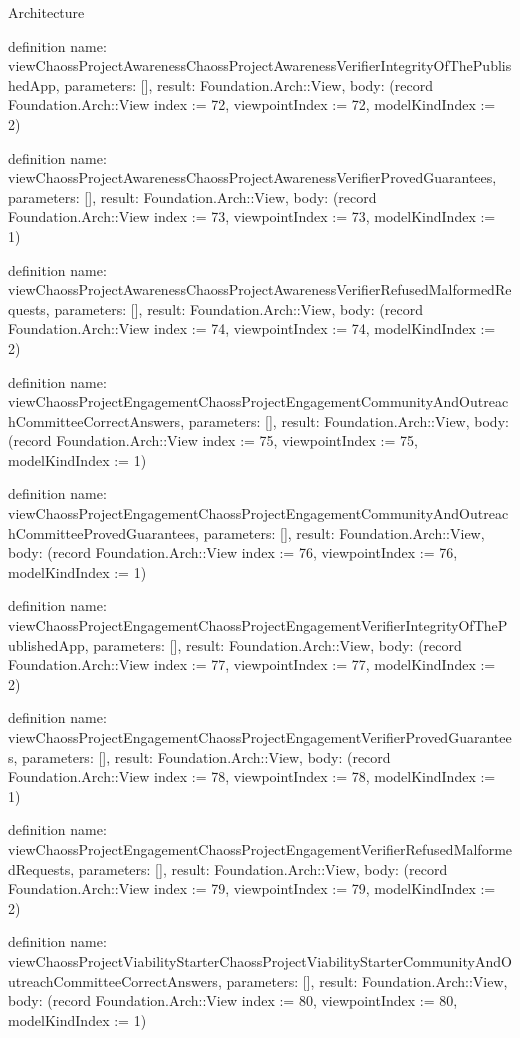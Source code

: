 \begin{lexlean}{Architecture}
\begin{semanticmodule}
definition{
  name: viewChaossProjectAwarenessChaossProjectAwarenessVerifierIntegrityOfThePublishedApp,
  parameters: [],
  result: Foundation.Arch::View,
  body: (record Foundation.Arch::View {index := 72, viewpointIndex := 72, modelKindIndex := 2})
}

definition{
  name: viewChaossProjectAwarenessChaossProjectAwarenessVerifierProvedGuarantees,
  parameters: [],
  result: Foundation.Arch::View,
  body: (record Foundation.Arch::View {index := 73, viewpointIndex := 73, modelKindIndex := 1})
}

definition{
  name: viewChaossProjectAwarenessChaossProjectAwarenessVerifierRefusedMalformedRequests,
  parameters: [],
  result: Foundation.Arch::View,
  body: (record Foundation.Arch::View {index := 74, viewpointIndex := 74, modelKindIndex := 2})
}

definition{
  name: viewChaossProjectEngagementChaossProjectEngagementCommunityAndOutreachCommitteeCorrectAnswers,
  parameters: [],
  result: Foundation.Arch::View,
  body: (record Foundation.Arch::View {index := 75, viewpointIndex := 75, modelKindIndex := 1})
}

definition{
  name: viewChaossProjectEngagementChaossProjectEngagementCommunityAndOutreachCommitteeProvedGuarantees,
  parameters: [],
  result: Foundation.Arch::View,
  body: (record Foundation.Arch::View {index := 76, viewpointIndex := 76, modelKindIndex := 1})
}

definition{
  name: viewChaossProjectEngagementChaossProjectEngagementVerifierIntegrityOfThePublishedApp,
  parameters: [],
  result: Foundation.Arch::View,
  body: (record Foundation.Arch::View {index := 77, viewpointIndex := 77, modelKindIndex := 2})
}

definition{
  name: viewChaossProjectEngagementChaossProjectEngagementVerifierProvedGuarantees,
  parameters: [],
  result: Foundation.Arch::View,
  body: (record Foundation.Arch::View {index := 78, viewpointIndex := 78, modelKindIndex := 1})
}

definition{
  name: viewChaossProjectEngagementChaossProjectEngagementVerifierRefusedMalformedRequests,
  parameters: [],
  result: Foundation.Arch::View,
  body: (record Foundation.Arch::View {index := 79, viewpointIndex := 79, modelKindIndex := 2})
}

definition{
  name: viewChaossProjectViabilityStarterChaossProjectViabilityStarterCommunityAndOutreachCommitteeCorrectAnswers,
  parameters: [],
  result: Foundation.Arch::View,
  body: (record Foundation.Arch::View {index := 80, viewpointIndex := 80, modelKindIndex := 1})
}


\end{semanticmodule}
\end{lexlean}
